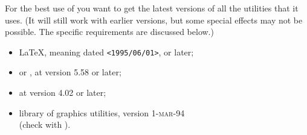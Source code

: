 \medskip\noindent
For the best use of \latextohtml{} you want to get the latest
versions of all the utilities that it uses. (It will still work
with earlier versions, but some  special effects may not be possible. 
The specific requirements are discussed below.)
%
\begin{itemize}

\item \LaTeX, meaning \LaTeXe{} dated \texttt{<1995/06/01>}, or later;
\item {} or , at version 5.58 or later;
\item {} at version 4.02 or later;
\item {} library of graphics utilities, version \textsc{1-mar-94}\\
  (check with  ).
\end{itemize}

